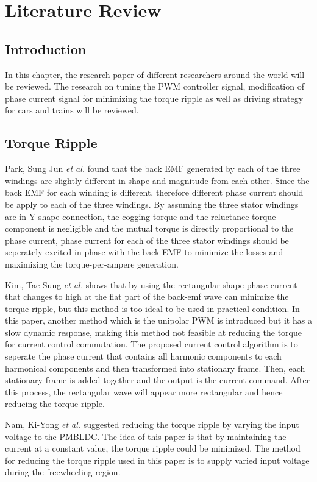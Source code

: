 \chapter{Literature Review}\label{chap:literature}
\section{Introduction}
In this chapter, the research paper of different researchers around the world will be reviewed. The research on tuning the PWM controller signal, modification of phase current signal for minimizing the torque ripple as well as driving strategy for cars and trains will be reviewed.

\section{Torque Ripple}
Park, Sung Jun \textit{et al.} \citep{00824132} found that the back EMF generated by each of the three windings are slightly different in shape and magnitude from each other. Since the back EMF for each winding is different, therefore different phase current should be apply to each of the three windings. By assuming the three stator windings are in Y-shape connection, the cogging torque and the reluctance torque component is negligible and the mutual torque is directly proportional to the phase current, phase current for each of the three stator windings should be seperately excited in phase with the back EMF to minimize the losses and maximizing the torque-per-ampere generation.

Kim, Tae-Sung \textit{et al.} \citep{00976016} shows that by using the rectangular shape phase current that changes to high at the flat part of the back-emf wave can minimize the torque ripple, but this method is too ideal to be used in practical condition. In this paper, another method which is the unipolar PWM is introduced but it has a slow dynamic response, making this method not feasible at reducing the torque for current control commutation. The proposed current control algorithm is to seperate the phase current that contains all harmonic components to each harmonical components and then transformed into stationary frame. Then, each stationary frame is added together and the output is the current command. After this process, the rectangular wave will appear more rectangular and hence reducing the torque ripple.

Nam, Ki-Yong \textit{et al.} \citep{01608454} suggested reducing the torque ripple by varying the input voltage to the PMBLDC. The idea of this paper is that by maintaining the current at a constant value, the torque ripple could be minimized. The method for reducing the torque ripple used in this paper is to supply varied input voltage during the freewheeling region.

